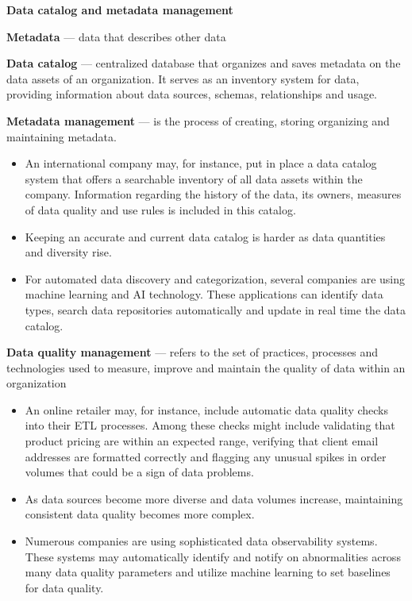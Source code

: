 \textbf{Data catalog and metadata management}

\textbf{Metadata} — data that describes other data

\textbf{Data catalog} — centralized database that organizes and saves metadata on the data assets of an organization. It serves as an inventory system for data, providing information about data sources, schemas, relationships and usage.

\textbf{Metadata management} — is the process of creating, storing organizing and maintaining metadata.

\begin{itemize}
    \item An international company may, for instance, put in place a data catalog system that offers a searchable inventory of all data assets within the company. Information regarding the history of the data, its owners, measures of data quality and use rules is included in this catalog.
    \item Keeping an accurate and current data catalog is harder as data quantities and diversity rise.
    \item For automated data discovery and categorization, several companies are using machine learning and AI technology. These applications can identify data types, search data repositories automatically and update in real time the data catalog.
\end{itemize}

\textbf{Data quality management} — refers to the set of practices, processes and technologies used to measure, improve and maintain the quality of data within an organization

\begin{itemize}
    \item An online retailer may, for instance, include automatic data quality checks into their ETL processes. Among these checks might include validating that product pricing are within an expected range, verifying that client email addresses are formatted correctly and flagging any unusual spikes in order volumes that could be a sign of data problems.
    \item As data sources become more diverse and data volumes increase, maintaining consistent data quality becomes more complex.
    \item Numerous companies are using sophisticated data observability systems. These systems may automatically identify and notify on abnormalities across many data quality parameters and utilize machine learning to set baselines for data quality.
\end{itemize}

